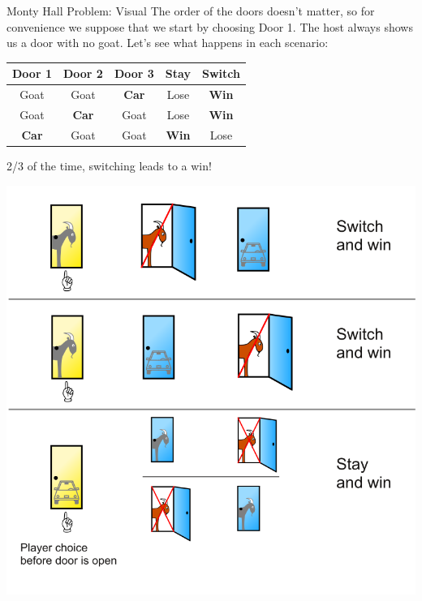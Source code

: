 \begin{frame}{Monty Hall Problem: Visual}
    The order of the doors doesn't matter, so for convenience we suppose that we start by choosing Door 1. The host always shows us a door with no goat. Let's see what happens in each scenario:
    
    \begin{center}
        \begin{tabular}{ccc cc}
            Door 1 & Door 2 & Door 3 & Stay & Switch \\
            \hline
            Goat & Goat & \textbf{Car} & Lose & \textbf{Win} \\
            Goat & \textbf{Car} & Goat & Lose & \textbf{Win} \\
            \textbf{Car} & Goat & Goat & \textbf{Win} & Lose
        \end{tabular}
    \end{center}
    2/3 of the time, switching leads to a win!
\end{frame}

\begin{frame}{}
    \begin{center}
        \includegraphics[scale=0.3]{images/montyhall2.png}
    \end{center}
\end{frame}

